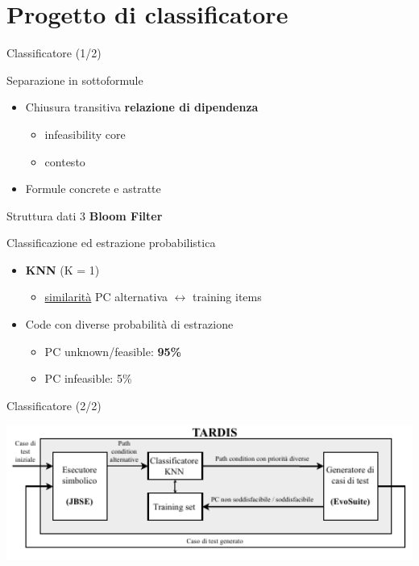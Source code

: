 \documentclass{beamer}
\begin{document}
\section{Progetto di classificatore}
\begin{frame}{Classificatore (1/2)}
    \vspace{-4pt}
    \begin{block}{Separazione in sottoformule}
        \begin{itemize}
        \item Chiusura transitiva \textbf{relazione di dipendenza} 
        \begin{itemize}
            \item infeasibility core
            \item contesto
        \end{itemize}
        \item Formule concrete e astratte
        \end{itemize}
    \end{block}
    \vspace{-4pt}
    \begin{block}{Struttura dati}
        3 \textbf{Bloom Filter}
    \end{block}
    \vspace{-4pt}
    \begin{block}{Classificazione ed estrazione probabilistica}
        \begin{itemize}
            \item \textbf{KNN} (K = 1)
            \begin{itemize}
                \item \underline{similarità} PC alternativa $\leftrightarrow$ training items
            \end{itemize}
            \item Code con diverse probabilità di estrazione
            \begin{itemize}
                \item PC unknown/feasible: \textbf{95\%}
                \item PC infeasible: 5\%
            \end{itemize}
        \end{itemize}
    \end{block}
\end{frame}

\begin{frame}{Classificatore (2/2)}
    \begin{minipage}[c]{\linewidth}
        \hspace{-11.28mm}
        \includegraphics[width=1.195\textwidth]{img/tardis-diagram-classifier.pdf}
    \end{minipage}
\end{frame}
\end{document}
